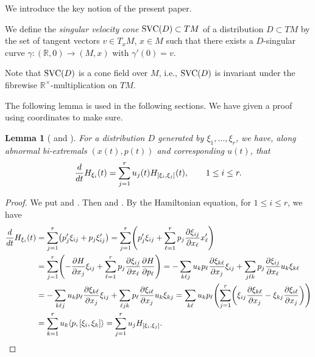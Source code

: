 \documentclass[11pt]{article}
\numberwithin{equation}{section}
\numberwithin{equation}{section}
\newtheorem{Lemma}[Theorem]{Lemma}
\theoremstyle{definition}
\newcommand{\R}{\mathbb{R}}
\newcommand{\0}{\boldsymbol{0}}
\newcommand{\pa}{\partial}
\newcommand{\SVC}{{\mbox {\rm SVC}}}
\begin{document}
We introduce the key notion of the present paper.

\begin{Definition}
We define the {\it singular velocity cone} $\SVC(D) \subset TM$ of a distribution ${D \subset TM}$ by
the set of tangent vectors $v \in T_xM$, $x \in M$ such that there exists a $D$-singular curve
$\gamma\colon (\R, 0) \to (M, x)$ with $\gamma'(0) = v$.
\end{Definition}

Note that $\SVC(D)$ is a cone field over $M$, i.e., $\SVC(D)$ is invariant under
the fibrewise $\R^\times$-multiplication on $TM$.

The following lemma is used in the following sections. We have given a proof using coordinates to make sure.

\begin{Lemma}[{\cite{AS}} and {\cite[Section~4.2]{BC}}]
\label{Singular-curve-lemma} For a distribution $D$ generated by $\xi_1, \dots, \xi_r$,
we have, along abnormal bi-extremals $(x(t), p(t))$ and corresponding $u(t)$, that
\[
\frac{{\rm d}}{{\rm d}t}H_{\xi_i}(t) = \sum_{j=1}^r u_j(t) H_{[\xi_i, \xi_j]}(t), \qquad 1 \leq i \leq r.
\]
\end{Lemma}
\begin{proof}
We put  and \smash{$\xi_i = \sum_{k=1}^r \xi_{ik}\frac{\pa}{\pa x_k}$}.
Then  and .
By the Hamiltonian equation, for $1 \leq i \leq r$, we have
\begin{align*}
\frac{{\rm d}}{{\rm d}t}H_{\xi_i}(t) & = \sum_{j=1}^r \bigl(p_j'\xi_{ij} + p_j\xi_{ij}'\bigr) =
\sum_{j=1}^r \Biggl(p_j'\xi_{ij} + \sum_{\ell =1}^r p_j\frac{\pa \xi_{ij}}{\pa x_\ell}x_{\ell}'\Biggr)
\\
& = \sum_{j=1}^r \Biggl(- \frac{\pa H}{\pa x_j}\xi_{ij}
+ \sum_{\ell =1}^r p_j\frac{\pa \xi_{ij}}{\pa x_\ell}\frac{\pa H}{\pa p_\ell}\Biggr)
 = - \sum_{k\ell j} u_kp_\ell \frac{\pa \xi_{k\ell}}{\pa x_j}\xi_{ij}
+ \sum_{j\ell k} p_j\frac{\pa \xi_{ij}}{\pa x_\ell}u_k\xi_{k\ell}
\\
& =
 - \sum_{k\ell j} u_kp_\ell \frac{\pa \xi_{k\ell}}{\pa x_j}\xi_{ij}
+ \sum_{\ell j k} p_\ell\frac{\pa \xi_{i\ell}}{\pa x_j}u_k\xi_{kj}
=
\sum_{k\ell} u_kp_\ell\Biggl(
\sum_{j=1}^r\biggl(
\xi_{ij}\frac{\pa \xi_{k\ell}}{\pa x_j} - \xi_{kj}\frac{\pa \xi_{i\ell}}{\pa x_j}
\biggr)
\Biggr)
\\
& = \sum_{k=1}^r u_k\langle p, [\xi_i, \xi_k]\rangle = \sum_{j=1}^r u_jH_{[\xi_i, \xi_j]}.
\tag*{\qed}
\end{align*}
\renewcommand{\qed}{}
\end{proof}
\end{document}
